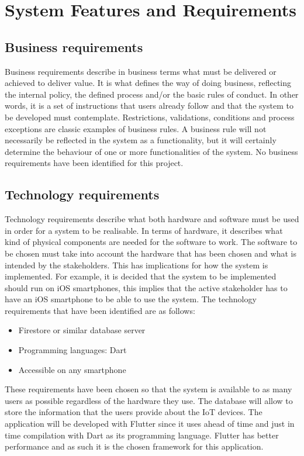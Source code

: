 \documentclass{scrreprt}
\begin{document}
\chapter{System Features and Requirements}

\section{Business requirements}

Business requirements describe in business terms what must be delivered
or achieved to deliver value. It is what defines the way of doing business,
reflecting the internal policy, the defined process and/or the basic rules
of conduct.  In other words, it is a set of instructions that users already
follow and that the system to be developed must contemplate. Restrictions,
validations, conditions and process exceptions are classic examples of business
rules. A business rule will not necessarily be reflected in the system as
a functionality, but it will certainly determine the behaviour of one or
more functionalities of the system.
\newline
No business requirements have been identified for this project.

\section{Technology requirements}

Technology requirements describe what both hardware and software must be
used in order for a system to be realisable. In terms of hardware, it describes
what kind of physical components are needed for the software to work. The
software to be chosen must take into account the hardware that has been
chosen and what is intended by the stakeholders. This has implications for
how the system is implemented. For example, it is decided that the system
to be implemented should run on iOS smartphones, this implies that the active
stakeholder has to have an iOS smartphone to be able to use the system.
\newline
The technology requirements that have been identified are as follows:
\begin{itemize}
    \item Firestore or similar database server
    \item Programming languages: Dart
    \item Accessible on any smartphone
\end{itemize}
These requirements have been chosen so that the system is available to as
many users as possible regardless of the hardware they use. The database
will allow to store the information that the users provide about the IoT
devices. The application will be developed with Flutter since it uses ahead
of time and just in time compilation with Dart as its programming language.
Flutter has better performance and as such it is the chosen framework for
this application.
\end{document}
